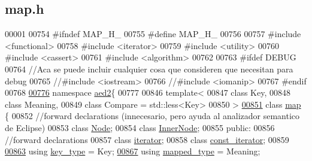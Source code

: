 \hypertarget{map_8h_source}{}\subsection{map.\+h}

\begin{DoxyCode}
00001 
00754 \textcolor{preprocessor}{#ifndef MAP\_H\_}
00755 \textcolor{preprocessor}{#define MAP\_H\_}
00756 
00757 \textcolor{preprocessor}{#include <functional>}
00758 \textcolor{preprocessor}{#include <iterator>}
00759 \textcolor{preprocessor}{#include <utility>}
00760 \textcolor{preprocessor}{#include <cassert>}
00761 \textcolor{preprocessor}{#include <algorithm>}
00762 
00763 \textcolor{preprocessor}{#ifdef DEBUG}
00764 \textcolor{comment}{//Aca se puede incluir cualquier cosa que consideren que necesitan para debug}
00765 \textcolor{comment}{//#include <iostream>}
00766 \textcolor{comment}{//#include <iomanip>}
00767 \textcolor{preprocessor}{#endif}
00768 
\hypertarget{map_8h_source.tex_l00776}{}\hyperlink{namespaceaed2}{00776} \textcolor{keyword}{namespace }\hyperlink{namespaceaed2}{aed2}\{
00777 
00846 \textcolor{keyword}{template}<
00847   \textcolor{keyword}{class }Key,
00848   \textcolor{keyword}{class }Meaning,
00849   \textcolor{keyword}{class }Compare = std::less<Key>
00850 >
\hypertarget{map_8h_source.tex_l00851}{}\hyperlink{classaed2_1_1map}{00851} \textcolor{keyword}{class }\hyperlink{classaed2_1_1map}{map} \{
00852     \textcolor{comment}{//forward declarations (innecesario, pero ayuda al analizador semantico de Eclipse)}
00853     \textcolor{keyword}{class }\hyperlink{structaed2_1_1map_1_1Node}{Node};
00854     \textcolor{keyword}{class }\hyperlink{structaed2_1_1map_1_1InnerNode}{InnerNode};
00855 \textcolor{keyword}{public}:
00856     \textcolor{comment}{//forward declarations}
00857     \textcolor{keyword}{class }\hyperlink{classaed2_1_1map_1_1iterator}{iterator};
00858     \textcolor{keyword}{class }\hyperlink{classaed2_1_1map_1_1const__iterator}{const\_iterator};
00859 
\hypertarget{map_8h_source.tex_l00863}{}\hyperlink{classaed2_1_1map_a4273e8812e7105a618df58a2c8b72b7d_a4273e8812e7105a618df58a2c8b72b7d}{00863}     \textcolor{keyword}{using} \hyperlink{classaed2_1_1map_a4273e8812e7105a618df58a2c8b72b7d_a4273e8812e7105a618df58a2c8b72b7d}{key\_type} = Key;
\hypertarget{map_8h_source.tex_l00867}{}\hyperlink{classaed2_1_1map_aa3e34bf624f3009884a71b18f4ddae40_aa3e34bf624f3009884a71b18f4ddae40}{00867}     \textcolor{keyword}{using} \hyperlink{classaed2_1_1map_aa3e34bf624f3009884a71b18f4ddae40_aa3e34bf624f3009884a71b18f4ddae40}{mapped\_type} = Meaning;

\end{DoxyCode}
